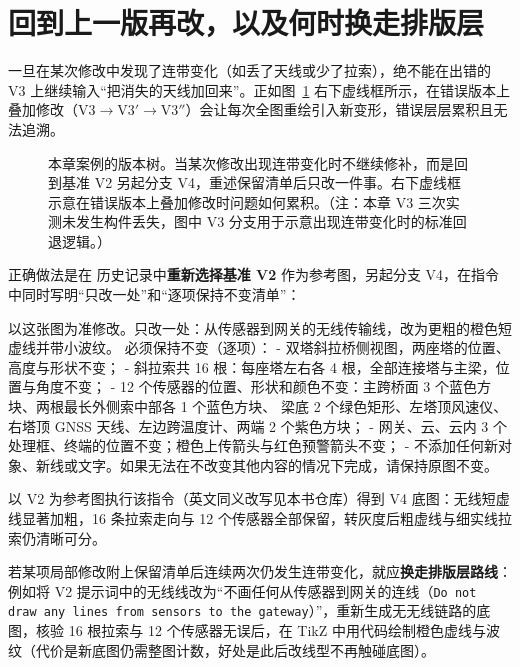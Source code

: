 \section{回到上一版再改，以及何时换走排版层}

一旦在某次修改中发现了连带变化（如丢了天线或少了拉索），绝不能在出错的 V3 上继续输入“把消失的天线加回来”。正如图~\ref{fig:ch11-08} 右下虚线框所示，在错误版本上叠加修改（$\text{V3} \rightarrow \text{V3}' \rightarrow \text{V3}''$）会让每次全图重绘引入新变形，错误层层累积且无法追溯。

\begin{figure}[htbp]\centering
{}
\caption{本章案例的版本树。当某次修改出现连带变化时不继续修补，而是回到基准 V2 另起分支 V4，重述保留清单后只改一件事。右下虚线框示意在错误版本上叠加修改时问题如何累积。（注：本章 V3 三次实测未发生构件丢失，图中 V3 分支用于示意出现连带变化时的标准回退逻辑。）}\label{fig:ch11-08}
\end{figure}

正确做法是在 \scidraw{} 历史记录中\textbf{重新选择基准 V2} 作为参考图，另起分支 V4，在指令中同时写明“只改一处”和“逐项保持不变清单”：

\begin{Prompt}
以这张图为准修改。只改一处：从传感器到网关的无线传输线，改为更粗的橙色短虚线并带小波纹。
必须保持不变（逐项）：
- 双塔斜拉桥侧视图，两座塔的位置、高度与形状不变；
- 斜拉索共 16 根：每座塔左右各 4 根，全部连接塔与主梁，位置与角度不变；
- 12 个传感器的位置、形状和颜色不变：主跨桥面 3 个蓝色方块、两根最长外侧索中部各 1 个蓝色方块、
  梁底 2 个绿色矩形、左塔顶风速仪、右塔顶 GNSS 天线、左边跨温度计、两端 2 个紫色方块；
- 网关、云、云内 3 个处理框、终端的位置不变；橙色上传箭头与红色预警箭头不变；
- 不添加任何新对象、新线或文字。如果无法在不改变其他内容的情况下完成，请保持原图不变。
\end{Prompt}

以 V2 为参考图执行该指令（英文同义改写见本书仓库）得到 V4 底图：无线短虚线显著加粗，16 条拉索走向与 12 个传感器全部保留，转灰度后粗虚线与细实线拉索仍清晰可分。

若某项局部修改附上保留清单后连续两次仍发生连带变化，就应\textbf{换走排版层路线}：例如将 V2 提示词中的无线线改为“不画任何从传感器到网关的连线（\texttt{Do not draw any lines from sensors to the gateway}）”，重新生成无无线链路的底图，核验 16 根拉索与 12 个传感器无误后，在 TikZ 中用代码绘制橙色虚线与波纹（代价是新底图仍需整图计数，好处是此后改线型不再触碰底图）。


